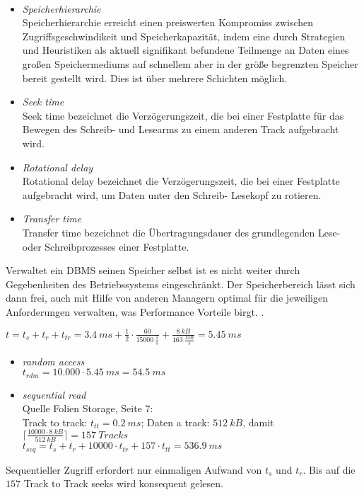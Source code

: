 \documentclass{uni_tue_template}
\begin{document}
%
\exercise{}\\

%
\newpage
\exercise{}
\begin{itemize}
	\item \emph{Speicherhierarchie}\\
	Speicherhierarchie erreicht einen preiswerten Kompromiss zwischen Zugriffsgeschwindikeit und Speicherkapazit\"at, indem eine durch Strategien und Heuristiken als aktuell signifikant befundene Teilmenge an Daten eines gro{\ss}en Speichermediums auf schnellem aber in der gr\"o{\ss}e begrenzten Speicher bereit gestellt wird. Dies ist \"uber mehrere Schichten m\"oglich.
	\item \emph{Seek time}\\
	Seek time bezeichnet die Verz\"ogerungszeit, die bei einer Festplatte f\"ur das Bewegen des Schreib- und Lesearms zu einem anderen Track aufgebracht wird.
	\item \emph{Rotational delay}\\
	Rotational delay bezeichnet die Verz\"ogerungszeit, die bei einer Festplatte  aufgebracht wird, um Daten unter den Schreib- Lesekopf zu rotieren.
	\item \emph{Transfer time}\\
	Transfer time bezeichnet die \"Ubertragungsdauer des grundlegenden Lese- oder Schreibprozesses einer Festplatte.
\end{itemize}
%
\newpage
\exercise{}
Verwaltet ein DBMS seinen Speicher selbst ist es nicht weiter durch Gegebenheiten des Betriebssystems eingeschr\"ankt. Der Speicherbereich l\"asst sich dann frei, auch mit Hilfe von anderen Managern optimal f\"ur die jeweiligen Anforderungen verwalten, was Performance Vorteile birgt.
.
%
\newpage
\exercise{}
	\item $t = t_s+t_r+t_{tr} = \SI{3.4}{ms}+\frac{1}{2}\cdot\frac{60}{\SI{15000}{\frac{1}{s}}}+\frac{\SI{8}{kB}}{\SI{163}{\frac{MB}{s}}} = \SI{5.45}{ms}$
		\begin{itemize}
			\item \emph{random access}\\
				$t_{rdm} = 10.000 \cdot \SI{5.45}{ms} = \SI{54.5}{ms}$
			\item \emph{sequential read}\\
				Quelle Folien Storage, Seite 7:\\
				Track to track: $t_{tt} = \SI{0.2}{ms}$; Daten a track: $\SI{512}{kB}$, damit $\lceil\frac{10000\cdot\SI{8}{kB}}{\SI{512}{kB}}\rceil = \SI{157}{Tracks}$\\
				$t_{seq} = t_s + t_r + 10000 \cdot t_{tr} + 157 \cdot t_{tt} = \SI{536.9}{ms}$
			
		\end{itemize}
	\item Sequentieller Zugriff erfordert nur einmaligen Aufwand von $t_s$ und $t_r$. Bis auf die $157$ Track to Track seeks wird konsequent gelesen. 
\subExEnd
\end{document}
